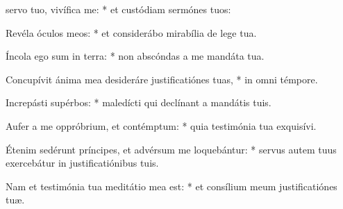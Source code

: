 \begin{psalmus}

 servo tuo, vivífica me: * et custódiam sermónes tuos:

Revéla óculos meos: * et considerábo mirabília de lege tua.

Íncola ego sum in terra: * non abscóndas a me mandáta tua.

Concupívit ánima mea desideráre justificatiónes tuas, * in omni témpore.

Increpásti supérbos: * maledícti qui declínant a mandátis tuis.

Aufer a me oppróbrium, et contémptum: * quia testimónia tua exquisívi.

Étenim sedérunt príncipes, et advérsum me loquebántur: * servus autem tuus exercebátur in justificatiónibus tuis.

Nam et testimónia tua meditátio mea est: * et consílium meum justificatiónes tuæ.

\end{psalmus}
